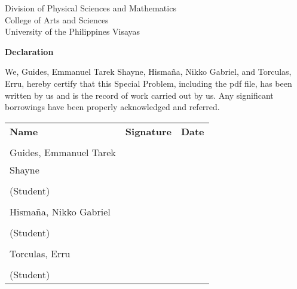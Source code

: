 \begin{center}
	Division of Physical Sciences and Mathematics\\
	College of Arts and Sciences\\
	University of the Philippines Visayas 
	
		\textbf{Declaration}
		\end{center}

We,  Guides, Emmanuel Tarek Shayne, Hismaña, Nikko Gabriel, and Torculas, Erru, hereby certify that this Special Problem, including the pdf file, has been written by us  and is the record of work carried out by us. Any significant borrowings have been properly acknowledged and referred.

	\begin{tabular}{lll}
	\bfseries Name  & \bfseries Signature & \bfseries Date\\ \\
    Guides, Emmanuel Tarek \\Shayne \\
	\signaturerule &\signaturerule  & \signaturerule\\ 
	(Student)\\ \\
    Hismaña, Nikko Gabriel \\
	\signaturerule &\signaturerule &\signaturerule\\
	(Student)\\ \\
    Torculas, Erru \\
	\signaturerule &\signaturerule &\signaturerule\\
	(Student)
\end{tabular}



